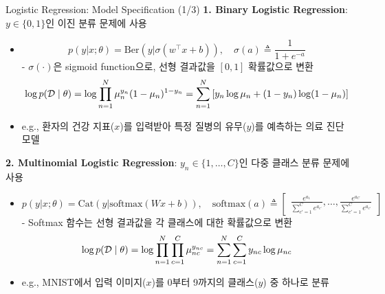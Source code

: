 \documentclass[xcolor=dvipsnames,t,9pt]{beamer}
\begin{document}

\begin{frame}{Logistic Regression: Model Specification (1/3)}
    \textbf{1. Binary Logistic Regression}: $y \in \{0, 1\}$인 이진 분류 문제에 사용
    \begin{itemize}
            \item[] \vspace{-1em}
            \[ p(y \vert x ; \theta) = \text{Ber}(y \vert \sigma(w^\top x + b)), \quad \sigma(a) \triangleq \frac{1}{1+e^{-a}}\]
            - $\sigma(\cdot)$은 sigmoid function으로, 선형 결과값을 $[0, 1]$ 확률값으로 변환
            \[ \small
            \log p(\mathcal{D}\mid \theta)
            = \log \prod_{n=1}^{N} \mu_n^{y_n}(1-\mu_n)^{1-y_n}
            = \sum_{n=1}^{N} \left[ y_n \log \mu_n + (1-y_n)\log(1-\mu_n) \right]
            \]
            \item e.g., 환자의 건강 지표($x$)를 입력받아 특정 질병의 유무($y$)를 예측하는 의료 진단 모델
        \end{itemize}
        \vfill
        \textbf{2. Multinomial Logistic Regression}: $y_n \in \{1, \dots, C\}$인 다중 클래스 분류 문제에 사용
        \begin{itemize}
            \item[] \vspace{-1.5em}
            \[ p(y \vert x ; \theta) = \text{Cat}(y \vert \text{softmax}(Wx+b)), \quad \text{softmax}(a) \triangleq \begin{bmatrix} \frac{e^{a_1}}{\sum_{c'=1}^C e^{a_{c'}}}, \dots, \frac{e^{a_C}}{\sum_{c'=1}^C e^{a_{c'}}}\end{bmatrix} \]
            - Softmax 함수는 선형 결과값을 각 클래스에 대한 확률값으로 변환
            \[ \small
            \log p(\mathcal{D}\mid \theta)
            = \log \prod_{n=1}^{N} \prod_{c=1}^{C} \mu_{nc}^{y_{nc}}
            = \sum_{n=1}^{N} \sum_{c=1}^{C} y_{nc} \log \mu_{nc}
            \]
            \item e.g., MNIST에서 입력 이미지($x$)를 0부터 9까지의 클래스($y$) 중 하나로 분류
        \end{itemize}
\end{frame}

\end{document}
